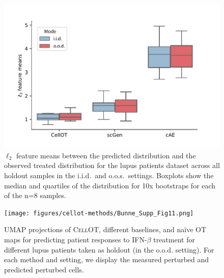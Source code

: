 \begin{figure}[H]
    \centering
    \includegraphics[width=.65\textwidth]{figures/cellot-methods/Bunne_Supp_Fig8.pdf}
    \caption{$\ell_2$ feature means between the predicted distribution and the observed treated distribution for the lupus patients dataset across all holdout samples in the i.i.d.~and o.o.s.~settings. Boxplots show the median and quartiles of the distribution for 10x bootstraps for each of the n=8 samples.}
    \label{supp_fig:lupus_iid_ood_l2ds}
\end{figure}


\begin{figure}[H]
    \centering
    \texttt{[image: figures/cellot-methods/Bunne\_Supp\_Fig11.png]}
    \caption{UMAP projections of \textsc{CellOT}, different baselines, and na\"ive OT maps for predicting patient responses to IFN-$\beta$ treatment for different lupus patients taken as holdout (in the o.o.d. setting). For each method and setting, we display the measured perturbed and predicted perturbed cells.}
    \label{supp_fig:lupus_umaps_all}
\end{figure}

